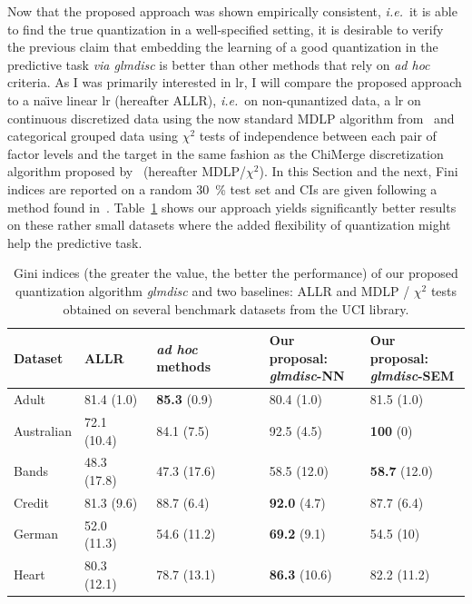 Now that the proposed approach was shown empirically consistent, \textit{i.e.}\ it is able to find the true quantization in a well-specified setting, it is desirable to verify the previous claim that embedding the learning of a good quantization in the predictive task \textit{via glmdisc} is better than other methods that rely on \textit{ad hoc} criteria. As I was primarily interested in \gls{lr}, I will compare the proposed approach to a na\"{\i}ve linear \gls{lr} (hereafter ALLR), \textit{i.e.}\ on non-qunantized data, a \gls{lr} on continuous discretized data using the now standard MDLP algorithm from~\cite{fayyad1993multi} and categorical grouped data using $\chi^2$ tests of independence between each pair of factor levels and the target in the same fashion as the ChiMerge discretization algorithm proposed by~\cite{kerber1992chimerge} (hereafter MDLP/$\chi^2$). In this Section and the next, Fini indices are reported on a random 30~\% test set and CIs are given following a method found in~\cite{sun2014fast}. Table~\ref{tab:banchmark} shows our approach yields significantly better results on these rather small datasets where the added flexibility of quantization might help the predictive task.

\begin{table}
    \centering
        \caption{Gini indices (the greater the value, the better the performance) of our proposed quantization algorithm \textit{glmdisc} and two baselines: ALLR and MDLP / $\chi^2$ tests obtained on several benchmark datasets from the UCI library.}
    \label{tab:banchmark}
\begin{small}
\begin{tabular}{lllll}
Dataset & ALLR & \textit{ad hoc} methods & \makecell{Our proposal:\\ \textit{glmdisc}-NN} & \makecell{Our proposal:\\ \textit{glmdisc}-SEM} \\
\hline
Adult & 81.4 (1.0) & \textbf{85.3} (0.9) & 80.4 (1.0) & 81.5 (1.0) \\
Australian & 72.1 (10.4) & 84.1 (7.5) & 92.5 (4.5) & \textbf{100} (0) \\
Bands & 48.3 (17.8) & 47.3 (17.6) & 58.5 (12.0) & \textbf{58.7} (12.0) \\
Credit & 81.3 (9.6) & 88.7 (6.4) & \textbf{92.0} (4.7) & 87.7 (6.4) \\
German & 52.0 (11.3) & 54.6 (11.2) & \textbf{69.2} (9.1) & 54.5 (10) \\
Heart & 80.3 (12.1) & 78.7 (13.1) & \textbf{86.3} (10.6) & 82.2 (11.2) 
\end{tabular}
\end{small}
\end{table}

